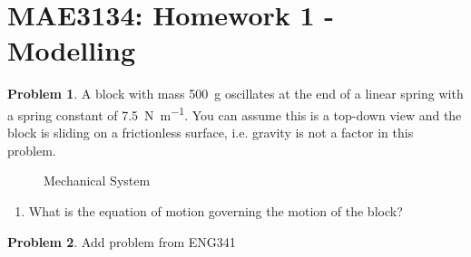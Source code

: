 \documentclass[10pt]{article}
\date{}
\theoremstyle{definition}
\newtheorem{prob}{Problem}[section]
\newenvironment{subprob}%
{\renewcommand{\theenumi}{\alph{enumi}}\renewcommand{\labelenumi}{(\theenumi)}\begin{enumerate}}%
{\end{enumerate}}%
\begin{document}
\pagestyle{empty}
\section*{MAE3134: Homework 1 - Modelling}
\vspace*{-0.4cm}


\begin{prob}
    A block with mass \SI{500}{\gram} oscillates at the end of a linear spring with a spring constant of \SI{7.5}{\newton\per\meter}.
    You can assume this is a top-down view and the block is sliding on a frictionless surface, i.e. gravity is not a factor in this problem.


    \begin{figure}[h]
        \centering
        \begin{scaletikzpicturetowidth}{0.5\textwidth}
        \end{scaletikzpicturetowidth}
        \caption{Mechanical System~\label{fig:mechanical_system}}
    \end{figure}

    \begin{subprob}
    \item What is the equation of motion governing the motion of the block?
    \end{subprob}
\end{prob}

\clearpage\newpage

\begin{prob}
   Add problem from ENG341 
\end{prob}
\end{document}
